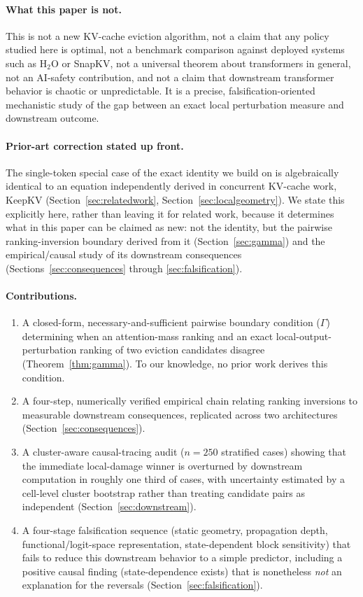 \documentclass[11pt]{article}
\begin{document}
\paragraph{What this paper is not.} This is not a new KV-cache eviction
algorithm, not a claim that any policy studied here is optimal, not a
benchmark comparison against deployed systems such as H$_2$O or SnapKV, not
a universal theorem about transformers in general, not an AI-safety
contribution, and not a claim that downstream transformer behavior is
chaotic or unpredictable. It is a precise, falsification-oriented
mechanistic study of the gap between an exact local perturbation measure and
downstream outcome.

\paragraph{Prior-art correction stated up front.} The single-token special
case of the exact identity we build on is algebraically identical to an
equation independently derived in concurrent KV-cache work, KeepKV
\cite{keepkv2025} (Section~\ref{sec:relatedwork},
Section~\ref{sec:localgeometry}). We state this explicitly here, rather than
leaving it for related work, because it determines what in this paper can be
claimed as new: not the identity, but the pairwise ranking-inversion
boundary derived from it (Section~\ref{sec:gamma}) and the empirical/causal
study of its downstream consequences (Sections~\ref{sec:consequences}
through \ref{sec:falsification}).

\paragraph{Contributions.}
\begin{enumerate}[nosep]
\item A closed-form, necessary-and-sufficient pairwise boundary condition
($\Gamma$) determining when an attention-mass ranking and an exact
local-output-perturbation ranking of two eviction candidates disagree
(Theorem~\ref{thm:gamma}). To our knowledge, no prior work derives this
condition.
\item A four-step, numerically verified empirical chain relating ranking
inversions to measurable downstream consequences, replicated across two
architectures (Section~\ref{sec:consequences}).
\item A cluster-aware causal-tracing audit ($n=250$ stratified cases)
showing that the immediate local-damage winner is overturned by downstream
computation in roughly one third of cases, with uncertainty estimated by a
cell-level cluster bootstrap rather than treating candidate pairs as
independent (Section~\ref{sec:downstream}).
\item A four-stage falsification sequence (static geometry, propagation
depth, functional/logit-space representation, state-dependent block
sensitivity) that fails to reduce this downstream behavior to a simple
predictor, including a positive causal finding (state-dependence exists) that
is nonetheless \emph{not} an explanation for the reversals
(Section~\ref{sec:falsification}).
\end{enumerate}
\end{document}
